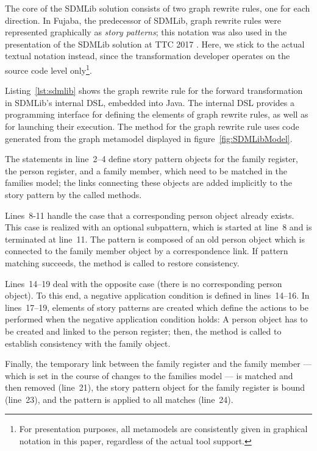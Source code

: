 The core of the SDMLib solution consists of two graph rewrite rules, one for each direction. In Fujaba, the predecessor of SDMLib, graph rewrite rules were represented graphically as \emph{story patterns}; this notation was also used in the presentation of the SDMLib solution at TTC 2017 \cite{Zundorf2017}. Here, we stick to the actual textual notation instead, since the transformation developer operates on the source code level only\footnote{For presentation purposes, all metamodels are consistently given in graphical notation in this paper, regardless of the actual tool support.}.

Listing~\ref{lst:sdmlib} shows the graph rewrite rule for the forward transformation in SDMLib's internal DSL, embedded into Java. The internal DSL provides a programming interface for defining the elements of graph rewrite rules, as well as for launching their execution. The method for the graph rewrite rule uses code generated from the graph metamodel displayed in figure~\ref{fig:SDMLibModel}. 

The statements in line~2--4 define story pattern objects for the family register, the person register, and a family member, which need to be matched in the families model; the links connecting these objects are added implicitly to the story pattern by the called methods. 

Lines~8-11 handle the case that a corresponding person object already exists. This case is realized with an optional subpattern, which is started at line~8 and is terminated at line~11. The pattern is composed of an old person object which is connected to the family member object by a correspondence link. If pattern matching succeeds, the method  is called to restore consistency.

Lines~14--19 deal with the opposite case (there is no corresponding person object). To this end, a negative application condition is defined in lines~14--16. In lines~17--19, elements of story patterns are created which define the actions to be performed when the negative application condition holds: A person object has to be created and linked to the person register; then, the method  is called to establish consistency with the family object.

Finally, the temporary link between the family register and the family member --- which is set in the course of changes to the families model --- is matched and then removed (line~21), the story pattern object for the family register is bound (line~23), and the pattern is applied to all matches (line~24).   

